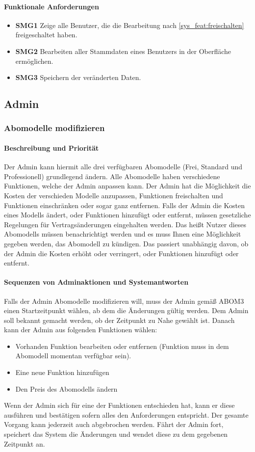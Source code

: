 \paragraph{Funktionale Anforderungen}
\begin{itemize}
	\item \textbf{SMG1} Zeige alle Benutzer, die die Bearbeitung nach \ref{sys_feat:freischalten} freigeschaltet haben.
	\item \textbf{SMG2} Bearbeiten aller Stammdaten eines Benutzers in der Oberfläche ermöglichen.
	\item \textbf{SMG3} Speichern der veränderten Daten.
\end{itemize}

\subsection{Admin}
\subsubsection{Abomodelle modifizieren}
\paragraph{Beschreibung und Priorität}
Der Admin kann hiermit alle drei verfügbaren Abomodelle (Frei, Standard und Professionell) grundlegend ändern. Alle Abomodelle haben verschiedene Funktionen, welche der Admin anpassen kann. Der Admin hat die Möglichkeit die Kosten der verschieden Modelle anzupassen, Funktionen freischalten und Funktionen einschränken oder sogar ganz entfernen. Falls der Admin die Kosten eines Modells ändert, oder Funktionen hinzufügt oder entfernt, müssen gesetzliche Regelungen für Vertragsänderungen eingehalten werden. Das heißt Nutzer dieses Abomodells müssen benachrichtigt werden und es muss Ihnen eine Möglichkeit gegeben werden, das Abomodell zu kündigen. Das passiert unabhängig davon, ob der Admin die Kosten erhöht oder verringert, oder Funktionen hinzufügt oder entfernt.
\paragraph{Sequenzen von Adminaktionen und Systemantworten}
Falls der Admin Abomodelle modifizieren will, muss der Admin gemäß ABOM3 einen Startzeitpunkt wählen, ab dem die Änderungen gültig werden. Dem Admin soll bekannt gemacht werden, ob der Zeitpunkt zu Nahe gewählt ist. Danach kann der Admin aus folgenden Funktionen wählen:
\begin{itemize}
	\item Vorhanden Funktion bearbeiten oder entfernen (Funktion muss in dem Abomodell momentan verfügbar sein).
	\item Eine neue Funktion hinzufügen
	\item Den Preis des Abomodells ändern
\end{itemize}
Wenn der Admin sich für eine der Funktionen entschieden hat, kann er diese ausführen und bestätigen sofern alles den Anforderungen entspricht. Der gesamte Vorgang kann jederzeit auch abgebrochen werden. Fährt der Admin fort, speichert das System die Änderungen und wendet diese zu dem gegebenen Zeitpunkt an.

